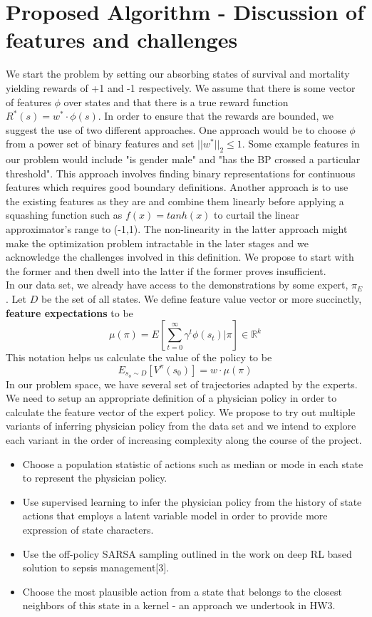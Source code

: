 \documentclass[twoside,11pt]{article}
\begin{document}
\section{Proposed Algorithm - Discussion of features and challenges }
We start the problem by setting our absorbing states of survival and mortality yielding rewards of +1 and -1 respectively. We assume that there is some vector of features $\phi$ over states and that there is a true reward function $R^*(s) = w^* \cdot \phi(s)$.  In order to ensure that the rewards are bounded, we suggest the use of two different approaches. One approach would be to choose $\phi$ from a power set of binary features and set $||w^*||_2 \leq 1$. Some example features in our problem would include "is gender male" and "has the BP crossed a particular threshold". This approach involves finding binary representations for continuous features which requires good boundary definitions. Another approach is to use the existing features as they are and combine them linearly before applying a squashing function such as $f(x) = tanh(x)$ to curtail the linear approximator's range  to (-1,1). The non-linearity in the latter approach might make the optimization problem intractable in the later stages and we acknowledge the challenges involved in this definition. We propose to start with the former and then dwell into the latter if the former proves insufficient. \\[10pt]
In our data set, we already have access to the demonstrations by some expert, $\pi_E$. Let $D$ be the set of all states. We define feature value vector or more succinctly, \textbf{feature expectations} to be 
\[\mu(\pi) = E[ \sum_{t=0}^{\infty} \gamma^t \phi(s_t) | \pi ] \in \mathbb{R}^k \]
This notation helps us calculate the value of the policy to be 
\[E_{s_o \sim D}[V^{\pi}(s_0)] = w \cdot \mu(\pi)\]
In our problem space, we have several set of trajectories adapted by the experts. We need to setup an appropriate definition of a physician policy in order to calculate the feature vector of the expert policy. We propose to try out multiple variants of inferring physician policy from the data set and we intend to explore each variant in the order of increasing complexity along the course of the project.
\begin{itemize}
\item Choose a population statistic of actions such as median or mode in each state to represent the physician policy.
\item Use supervised learning to infer the physician policy from the history of state actions that employs a latent variable model in order to provide more expression of state characters.
\item Use the off-policy SARSA sampling outlined in the work on deep RL based solution to sepsis management[3]. 
\item Choose the most plausible action from a state that belongs to the closest neighbors of this state in a kernel - an approach we undertook in HW3.
\end{itemize}
\end{document}
